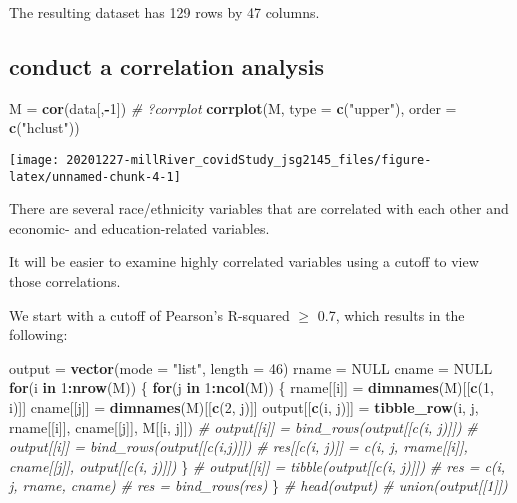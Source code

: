 \documentclass[
]{article}
\newenvironment{Shaded}{\begin{snugshade}}{\end{snugshade}}
\newcommand{\CommentTok}[1]{\textcolor[rgb]{0.56,0.35,0.01}{\textit{#1}}}
\newcommand{\ControlFlowTok}[1]{\textcolor[rgb]{0.13,0.29,0.53}{\textbf{#1}}}
\newcommand{\DataTypeTok}[1]{\textcolor[rgb]{0.13,0.29,0.53}{#1}}
\newcommand{\DecValTok}[1]{\textcolor[rgb]{0.00,0.00,0.81}{#1}}
\newcommand{\KeywordTok}[1]{\textcolor[rgb]{0.13,0.29,0.53}{\textbf{#1}}}
\newcommand{\NormalTok}[1]{#1}
\newcommand{\OperatorTok}[1]{\textcolor[rgb]{0.81,0.36,0.00}{\textbf{#1}}}
\newcommand{\OtherTok}[1]{\textcolor[rgb]{0.56,0.35,0.01}{#1}}
\newcommand{\StringTok}[1]{\textcolor[rgb]{0.31,0.60,0.02}{#1}}
\begin{document}
The resulting dataset has 129 rows by 47 columns.

\hypertarget{conduct-a-correlation-analysis}{%
\subsection{conduct a correlation
analysis}\label{conduct-a-correlation-analysis}}

\begin{Shaded}
\begin{Highlighting}[]
\NormalTok{M =}\StringTok{ }\KeywordTok{cor}\NormalTok{(data[,}\OperatorTok{-}\DecValTok{1}\NormalTok{])}
\CommentTok{# ?corrplot}
\KeywordTok{corrplot}\NormalTok{(M, }\DataTypeTok{type =} \KeywordTok{c}\NormalTok{(}\StringTok{"upper"}\NormalTok{), }\DataTypeTok{order =} \KeywordTok{c}\NormalTok{(}\StringTok{"hclust"}\NormalTok{))}
\end{Highlighting}
\end{Shaded}

\texttt{[image: 20201227-millRiver\_covidStudy\_jsg2145\_files/figure-latex/unnamed-chunk-4-1]}

There are several race/ethnicity variables that are correlated with each
other and economic- and education-related variables.

It will be easier to examine highly correlated variables using a cutoff
to view those correlations.

We start with a cutoff of Pearson's R-squared \(\ge\) 0.7, which results
in the following:

\begin{Shaded}
\begin{Highlighting}[]
\NormalTok{output =}\StringTok{ }\KeywordTok{vector}\NormalTok{(}\DataTypeTok{mode =} \StringTok{"list"}\NormalTok{, }\DataTypeTok{length =} \DecValTok{46}\NormalTok{)}
\NormalTok{rname =}\StringTok{ }\OtherTok{NULL}
\NormalTok{cname =}\StringTok{ }\OtherTok{NULL}
\ControlFlowTok{for}\NormalTok{(i }\ControlFlowTok{in} \DecValTok{1}\OperatorTok{:}\KeywordTok{nrow}\NormalTok{(M)) \{}
  \ControlFlowTok{for}\NormalTok{(j }\ControlFlowTok{in} \DecValTok{1}\OperatorTok{:}\KeywordTok{ncol}\NormalTok{(M)) \{}
\NormalTok{    rname[[i]] =}\StringTok{ }\KeywordTok{dimnames}\NormalTok{(M)[[}\KeywordTok{c}\NormalTok{(}\DecValTok{1}\NormalTok{, i)]]}
\NormalTok{    cname[[j]] =}\StringTok{ }\KeywordTok{dimnames}\NormalTok{(M)[[}\KeywordTok{c}\NormalTok{(}\DecValTok{2}\NormalTok{, j)]]}
\NormalTok{    output[[}\KeywordTok{c}\NormalTok{(i, j)]] =}\StringTok{ }\KeywordTok{tibble_row}\NormalTok{(i, j, rname[[i]], cname[[j]], M[[i, j]])}
    \CommentTok{# output[[i]] = bind_rows(output[[c(i, j)]])}
    \CommentTok{# output[[i]] = bind_rows(output[[c(i,j)]])}
    \CommentTok{# res[[c(i, j)]] = c(i, j, rname[[i]], cname[[j]], output[[c(i, j)]])}
\NormalTok{  \}}
  \CommentTok{# output[[i]] = tibble(output[[c(i, j)]])}
  \CommentTok{# res = c(i, j, rname, cname)}
  \CommentTok{# res = bind_rows(res)}
\NormalTok{\}}
\CommentTok{# head(output)}
\CommentTok{# union(output[[1]])}
\end{Highlighting}
\end{Shaded}
\end{document}
